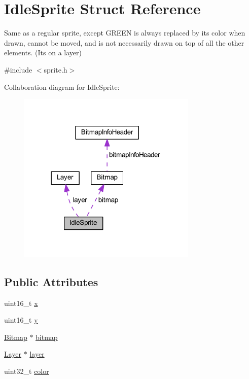 \hypertarget{struct_idle_sprite}{}\section{Idle\+Sprite Struct Reference}
\label{struct_idle_sprite}


Same as a regular sprite, except G\+R\+E\+EN is always replaced by its color when drawn, cannot be moved, and is not necessarily drawn on top of all the other elements. (It\textquotesingle{}s on a layer)  




{\ttfamily \#include $<$sprite.\+h$>$}



Collaboration diagram for Idle\+Sprite\+:\nopagebreak
\begin{figure}[H]
\begin{center}
\leavevmode
\includegraphics[width=242pt]{struct_idle_sprite__coll__graph}
\end{center}
\end{figure}
\subsection*{Public Attributes}
\begin{DoxyCompactItemize}
\item 
uint16\+\_\+t \mbox{\hyperlink{group__sprite_gaccc6cfeb632527dbc79a1017f8f3a237}{x}}
\item 
uint16\+\_\+t \mbox{\hyperlink{group__sprite_ga63da8969e319d653ed0608c49056bcde}{y}}
\item 
\mbox{\hyperlink{struct_bitmap}{Bitmap}} $\ast$ \mbox{\hyperlink{group__sprite_ga43ec29869061c84e407f6351ce4e8efe}{bitmap}}
\item 
\mbox{\hyperlink{struct_layer}{Layer}} $\ast$ \mbox{\hyperlink{group__sprite_ga30536ca9bdfd98e84322bb2275f59d1a}{layer}}
\item 
uint32\+\_\+t \mbox{\hyperlink{group__sprite_gaf2cfbfe5f907f5f0abbd8d673bce19db}{color}}
\end{DoxyCompactItemize}


